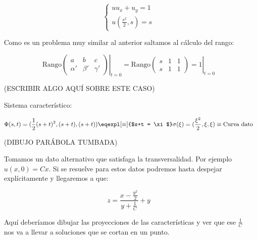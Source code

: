 	\begin{example}{7}

		\[
		\left\{
		\begin{array}{l}
			uu_x+ u_y = 1\\
			u(\frac{s^2}{2}, s) = s
		\end{array}
		\right.
		\]

		Como es un problema muy similar al anterior saltamos al cálculo del rango:

		\[ \text{Rango}
		\left. \begin{pmatrix}
			a & b & c \\
			\alpha' & \beta' & \gamma'
		\end{pmatrix}
		\right|_{t=0} = \text{Rango}
		\left. \begin{pmatrix}
			s &1 & 1 \\
			s &1 & 1
		\end{pmatrix} = 1
		\right|_{t=0}
		\]

		(ESCRIBIR ALGO AQUÍ SOBRE ESTE CASO)

		Sistema característico:

		\[
		\Phi(s,t) = (\frac{1}{2}(s+t)^2, (s+t), (s+t)) \eqexpl[\equiv]{$s+t = \xi$} \sigma(\xi) = (\frac{\xi^2}{2}, \xi, \xi) \equiv \text{Curva dato}
		\]

		(DIBUJO PARÁBOLA TUMBADA)

		Tomamos un dato alternativo que satisfaga la transversalidad. Por ejemplo $u(x,0) = Cx$. Si se resuelve para estos datos podremos hasta despejar explícitamente y llegaremos a que:

		\[ z = \frac{x-\frac{y^2}{2}}{y + \frac{1}{C}}+y
		\]

		Aquí deberíamos dibujar las proyecciones de las características y ver que ese $\frac{1}{C}$ nos va a llevar a soluciones que se cortan en un punto.

	\end{example}

